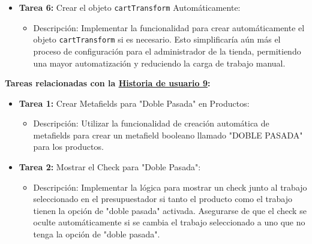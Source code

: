 \documentclass[12pt]{article}
\begin{document}
\begin{itemize}
\begin{itemize}[label=--]
          \end{itemize}
    \item \textbf{Tarea 6:} Crear el objeto \texttt{cartTransform} Automáticamente:
          \begin{itemize}[label=--]
              \item Descripción: Implementar la funcionalidad para crear automáticamente el objeto \texttt{cartTransform} si es necesario. Esto simplificaría aún más el proceso de configuración para el administrador de la tienda, permitiendo una mayor automatización y reduciendo la carga de trabajo manual.
          \end{itemize}
\end{itemize}

\textbf{Tareas relacionadas con la \hyperref[sec:historia9]{Historia de usuario 9}:}
\begin{itemize}
    \item \textbf{Tarea 1:} Crear Metafields para "Doble Pasada" en Productos:
          \begin{itemize}[label=--]
              \item Descripción: Utilizar la funcionalidad de creación automática de metafields para crear un metafield booleano llamado "DOBLE PASADA" para los productos.
          \end{itemize}
    \item \textbf{Tarea 2:} Mostrar el Check para "Doble Pasada":
          \begin{itemize}[label=--]
              \item Descripción: Implementar la lógica para mostrar un check junto al trabajo seleccionado en el presupuestador si tanto el producto como el trabajo tienen la opción de "doble pasada" activada. Asegurarse de que el check se oculte automáticamente si se cambia el trabajo seleccionado a uno que no tenga la opción de "doble pasada".
          \end{itemize}
\end{itemize}
\end{document}
